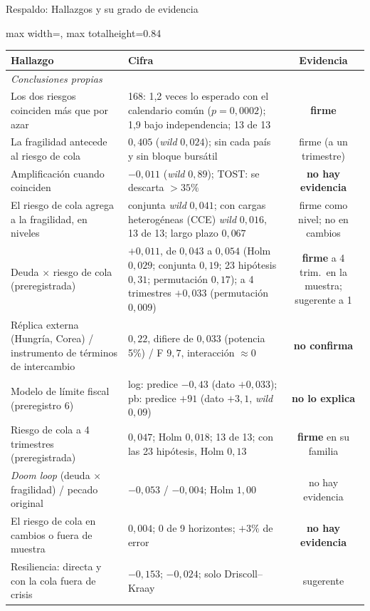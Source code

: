\documentclass[aspectratio=169]{beamer}
\begin{document}
\begin{frame}{Respaldo: Hallazgos y su grado de evidencia}
\centering
\footnotesize
\begin{adjustbox}{max width=\textwidth, max totalheight=0.84\textheight}
\begin{tabular}{llc}
\toprule
Hallazgo & Cifra & Evidencia \\
\midrule
\multicolumn{3}{l}{\textit{Conclusiones propias}} \\
Los dos riesgos coinciden más que por azar & 168: 1,2 veces lo esperado con el calendario común ($p=0{,}0002$); 1,9 bajo independencia; 13 de 13 & \textbf{firme} \\
La fragilidad antecede al riesgo de cola & $0{,}405$ (\textit{wild} $0{,}024$); sin cada país y sin bloque bursátil & firme (a un trimestre) \\
Amplificación cuando coinciden & $-0{,}011$ (\textit{wild} $0{,}89$); TOST: se descarta $>35\%$ & \textbf{no hay evidencia} \\
El riesgo de cola agrega a la fragilidad, en niveles & conjunta \textit{wild} $0{,}041$; con cargas heterogéneas (CCE) \textit{wild} $0{,}016$, 13 de 13; largo plazo $0{,}067$ & firme como nivel; no en cambios \\
Deuda $\times$ riesgo de cola (preregistrada) & $+0{,}011$, de $0{,}043$ a $0{,}054$ (Holm $0{,}029$; conjunta $0{,}19$; 23 hipótesis $0{,}31$; permutación $0{,}17$); a 4 trimestres $+0{,}033$ (permutación $0{,}009$) & \textbf{firme} a 4 trim.\ en la muestra; sugerente a 1 \\
Réplica externa (Hungría, Corea) / instrumento de términos de intercambio & $0{,}22$, difiere de $0{,}033$ (potencia 5\%) / F $9{,}7$, interacción $\approx0$ & \textbf{no confirma} \\
Modelo de límite fiscal (preregistro 6) & log: predice $-0{,}43$ (dato $+0{,}033$); pb: predice $+91$ (dato $+3{,}1$, \textit{wild} $0{,}09$) & \textbf{no lo explica} \\
Riesgo de cola a 4 trimestres (preregistrada) & $0{,}047$; Holm $0{,}018$; 13 de 13; con las 23 hipótesis, Holm $0{,}13$ & \textbf{firme} en su familia \\
\textit{Doom loop} (deuda $\times$ fragilidad) / pecado original & $-0{,}053$ / $-0{,}004$; Holm $1{,}00$ & no hay evidencia \\
El riesgo de cola en cambios o fuera de muestra & $0{,}004$; 0 de 9 horizontes; $+3\%$ de error & \textbf{no hay evidencia} \\
Resiliencia: directa y con la cola fuera de crisis & $-0{,}153$; $-0{,}024$; solo Driscoll--Kraay & sugerente \\

\end{tabular}
\end{adjustbox}
\end{frame}
\end{document}

